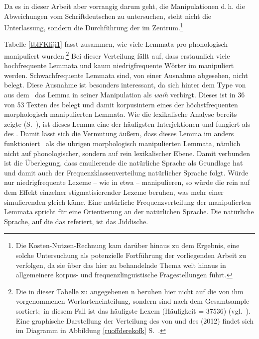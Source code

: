  Da es in dieser Arbeit aber vorrangig darum geht, die Manipulationen d.\,h. die Abweichungen vom Schriftdeutschen zu untersuchen, steht nicht die Unterlassung, sondern die Durchführung der  im Zentrum.\footnote{Die Kosten-Nutzen-Rechnung kam darüber hinaus zu dem Ergebnis, eine solche Untersuchung als potenzielle Fortführung der vorliegenden Arbeit zu verfolgen, da sie über das hier zu behandelnde Thema weit hinaus in allgemeinere korpus- und frequenzlinguistische Fragestellungen führt.} 


 Tabelle \ref{tblFKliji1} fasst zusammen, wie viele Lemmata pro  phonologisch manipuliert wurden.\footnote{Die in dieser Tabelle zu \cite{Ruoff1981} angegebenen n beruhen hier nicht auf die von ihm vorgenommenen Wortarteneinteilung, sondern sind nach dem Gesamtsample sortiert;\, in diesem Fall ist das häufigste Lexem  (Häufigkeit = 37536) (vgl.\, \citealt[514]{Ruoff1981}). Eine graphische Darstellung der Verteilung des  von \cite{Ruoff1981} und des  (2012) findet sich im Diagramm in Abbildung \ref{ruoffderekofk} S.\, \pageref{ruoffderekofk}.} Bei dieser Verteilung fällt auf, dass erstaunlich viele hochfrequente Lemmata und kaum niedrigfrequente Wörter im  manipuliert werden. Schwachfrequente Lemmata sind, von einer Ausnahme abgesehen, nicht belegt. Diese Ausnahme ist besonders interessant, da sich hinter dem Type von  aus dem  \,%
 das Lemma  in seiner Manipulation als \textit{waih} verbirgt. Dieses ist in 36 von 53 Texten des  belegt und damit korpusintern eines der höchstfrequenten morphologisch manipulierten Lemmata. Wie die lexikalische Analyse bereits zeigte (S.\, \pageref{interjektionen}), ist dieses Lemma eine der häufigsten Interjektionen und fungiert als  des \hai{{\LiJieins}}. Damit lässt sich die Vermutung äußern, dass dieses Lemma im  anders funktioniert \,%
 als die übrigen morphologisch manipulierten Lemmata, nämlich nicht auf phonologischer, sondern auf rein lexikalischer Ebene. Damit verbunden ist die Überlegung, dass emulierende  die natürliche Sprache als Grundlage hat und damit auch der Frequenzklassenverteilung natürlicher Sprache folgt. Würde  nur niedrigfrequente Lexeme – wie in etwa  – manipulieren, so würde die  rein auf dem Effekt einzelner stigmatisierender Lexeme beruhen, was mehr einer simulierenden  gleich käme. Eine natürliche Frequenzverteilung der manipulierten Lemmata spricht für eine Orientierung an der natürlichen Sprache. Die natürliche Sprache, auf die das \hai{{\LiJi}} referiert, ist das Jiddische. %
